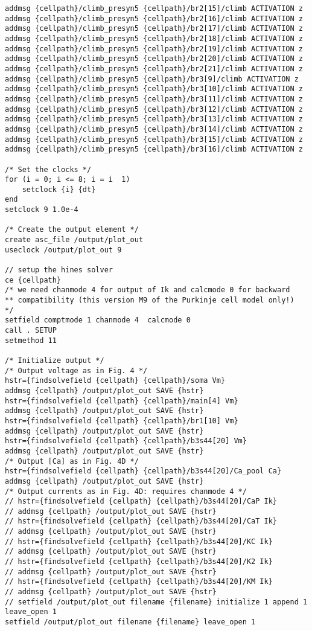 \documentclass[10pt]{article}
\begin{document}
\begin{verbatim}
addmsg {cellpath}/climb_presyn5 {cellpath}/br2[15]/climb ACTIVATION z
addmsg {cellpath}/climb_presyn5 {cellpath}/br2[16]/climb ACTIVATION z
addmsg {cellpath}/climb_presyn5 {cellpath}/br2[17]/climb ACTIVATION z
addmsg {cellpath}/climb_presyn5 {cellpath}/br2[18]/climb ACTIVATION z
addmsg {cellpath}/climb_presyn5 {cellpath}/br2[19]/climb ACTIVATION z
addmsg {cellpath}/climb_presyn5 {cellpath}/br2[20]/climb ACTIVATION z
addmsg {cellpath}/climb_presyn5 {cellpath}/br2[21]/climb ACTIVATION z
addmsg {cellpath}/climb_presyn5 {cellpath}/br3[9]/climb ACTIVATION z
addmsg {cellpath}/climb_presyn5 {cellpath}/br3[10]/climb ACTIVATION z
addmsg {cellpath}/climb_presyn5 {cellpath}/br3[11]/climb ACTIVATION z
addmsg {cellpath}/climb_presyn5 {cellpath}/br3[12]/climb ACTIVATION z
addmsg {cellpath}/climb_presyn5 {cellpath}/br3[13]/climb ACTIVATION z
addmsg {cellpath}/climb_presyn5 {cellpath}/br3[14]/climb ACTIVATION z
addmsg {cellpath}/climb_presyn5 {cellpath}/br3[15]/climb ACTIVATION z
addmsg {cellpath}/climb_presyn5 {cellpath}/br3[16]/climb ACTIVATION z

/* Set the clocks */
for (i = 0; i <= 8; i = i  1)
    setclock {i} {dt}
end
setclock 9 1.0e-4

/* Create the output element */
create asc_file /output/plot_out
useclock /output/plot_out 9

// setup the hines solver
ce {cellpath}
/* we need chanmode 4 for output of Ik and calcmode 0 for backward 
** compatibility (this version M9 of the Purkinje cell model only!)
*/
setfield comptmode 1 chanmode 4  calcmode 0
call . SETUP
setmethod 11

/* Initialize output */
/* Output voltage as in Fig. 4 */
hstr={findsolvefield {cellpath} {cellpath}/soma Vm}
addmsg {cellpath} /output/plot_out SAVE {hstr}
hstr={findsolvefield {cellpath} {cellpath}/main[4] Vm}
addmsg {cellpath} /output/plot_out SAVE {hstr}
hstr={findsolvefield {cellpath} {cellpath}/br1[10] Vm}
addmsg {cellpath} /output/plot_out SAVE {hstr}
hstr={findsolvefield {cellpath} {cellpath}/b3s44[20] Vm}
addmsg {cellpath} /output/plot_out SAVE {hstr}
/* Output [Ca] as in Fig. 4D */
hstr={findsolvefield {cellpath} {cellpath}/b3s44[20]/Ca_pool Ca}
addmsg {cellpath} /output/plot_out SAVE {hstr}
/* Output currents as in Fig. 4D: requires chanmode 4 */
// hstr={findsolvefield {cellpath} {cellpath}/b3s44[20]/CaP Ik}
// addmsg {cellpath} /output/plot_out SAVE {hstr}
// hstr={findsolvefield {cellpath} {cellpath}/b3s44[20]/CaT Ik}
// addmsg {cellpath} /output/plot_out SAVE {hstr}
// hstr={findsolvefield {cellpath} {cellpath}/b3s44[20]/KC Ik}
// addmsg {cellpath} /output/plot_out SAVE {hstr}
// hstr={findsolvefield {cellpath} {cellpath}/b3s44[20]/K2 Ik}
// addmsg {cellpath} /output/plot_out SAVE {hstr}
// hstr={findsolvefield {cellpath} {cellpath}/b3s44[20]/KM Ik}
// addmsg {cellpath} /output/plot_out SAVE {hstr}
// setfield /output/plot_out filename {filename} initialize 1 append 1 leave_open 1
setfield /output/plot_out filename {filename} leave_open 1


\end{verbatim}
\end{document}
